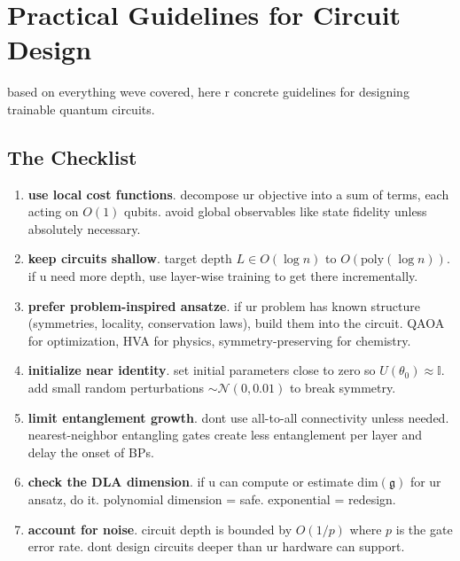 \documentclass[11pt,a4paper]{article}
\theoremstyle{definition}
\theoremstyle{remark}
\begin{document}
\section{Practical Guidelines for Circuit Design}

based on everything weve covered, here r concrete guidelines for designing trainable quantum circuits.

\subsection{The Checklist}

\begin{enumerate}[label=\textbf{G\arabic*.}]
    \item \textbf{use local cost functions}. decompose ur objective into a sum of terms, each acting on $O(1)$ qubits. avoid global observables like state fidelity unless absolutely necessary.

    \item \textbf{keep circuits shallow}. target depth $L \in O(\log n)$ to $O(\text{poly}(\log n))$. if u need more depth, use layer-wise training to get there incrementally.

    \item \textbf{prefer problem-inspired ansatze}. if ur problem has known structure (symmetries, locality, conservation laws), build them into the circuit. QAOA for optimization, HVA for physics, symmetry-preserving for chemistry.

    \item \textbf{initialize near identity}. set initial parameters close to zero so $U(\theta_0) \approx \mathbb{I}$. add small random perturbations $\sim \mathcal{N}(0, 0.01)$ to break symmetry.

    \item \textbf{limit entanglement growth}. dont use all-to-all connectivity unless needed. nearest-neighbor entangling gates create less entanglement per layer and delay the onset of BPs.

    \item \textbf{check the DLA dimension}. if u can compute or estimate $\text{dim}(\mathfrak{g})$ for ur ansatz, do it. polynomial dimension = safe. exponential = redesign.

    \item \textbf{account for noise}. circuit depth is bounded by $O(1/p)$ where $p$ is the gate error rate. dont design circuits deeper than ur hardware can support.


\end{enumerate}
\end{document}
